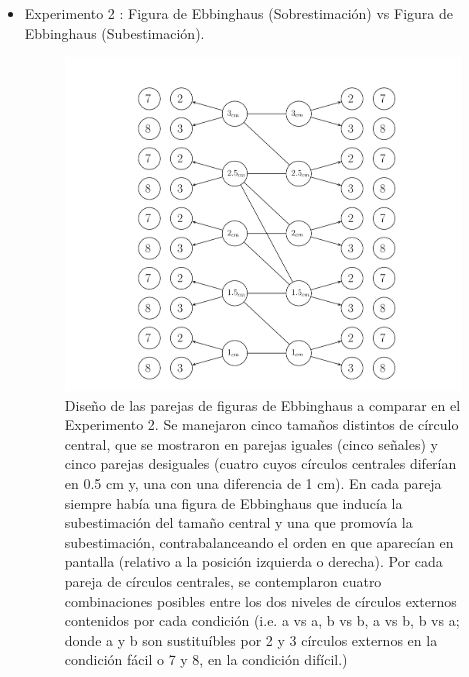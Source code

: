 \begin{itemize}
\item Experimento 2 : Figura de Ebbinghaus (Sobrestimación) vs Figura de Ebbinghaus (Subestimación).



\begin{figure}[th]
\centering
\includegraphics[width=0.99\textwidth]{Figures/Estimulos_Experimento2} 
\decoRule
\caption[Diseño de Estimulos en el Experimento 2]{Diseño de las parejas  de figuras de Ebbinghaus a comparar en el Experimento 2. Se manejaron cinco tamaños distintos de círculo central, que se mostraron en parejas iguales (cinco señales) y cinco parejas desiguales (cuatro cuyos círculos centrales diferían en 0.5 cm y, una con una diferencia de 1 cm). En cada pareja siempre había una figura de Ebbinghaus que inducía la subestimación del tamaño central y una que promovía la subestimación, contrabalanceando el orden en que aparecían en pantalla (relativo a la posición izquierda o derecha). Por cada pareja de círculos centrales, se contemplaron cuatro combinaciones posibles entre los dos niveles de círculos externos contenidos por cada condición (i.e. a vs a, b vs b, a vs b, b vs a; donde a y b son sustituíbles por 2 y 3 círculos externos en la condición fácil o 7 y 8, en la condición difícil.)}
\label{fig:Exp_2}
\end{figure}

\end{itemize}





